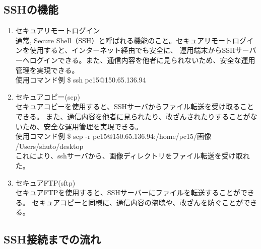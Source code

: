 \documentclass[11pt,a4j,titlepage]{jreport}
\begin{document}
\subsection{SSHの機能}



\begin{enumerate}
    \item セキュアリモートログイン\mbox{}\\通常,
    Secure Shell（SSH）と呼ばれる機能のこと。セキュアリモートログインを使用すると、インターネット経由でも安全に、
    運用端末からSSHサーバーへログインできる。また、通信内容を他者に見られないため、安全な運用管理を実現できる。
    \\使用コマンド例   \$ ssh pc15@150.65.136.94

    \item セキュアコピー(scp)\mbox{}\\セキュアコピーを使用すると、SSHサーバからファイル転送を受け取ることできる。
    また、通信内容を他者に見られたり、改ざんされたりすることがないため、安全な運用管理を実現できる。
    \\使用コマンド例   \$ scp -r pc15@150.65.136.94:/home/pc15/画像 /Users/shuto/desktop\\
    これにより、sshサーバから、画像ディレクトリをファイル転送を受け取れた。

    \item セキュアFTP(sftp)\mbox{}\\セキュアFTPを使用すると、SSHサーバーにファイルを転送することができる。
    セキュアコピーと同様に、通信内容の盗聴や、改ざんを防ぐことができる。
    
\end{enumerate}



\subsection{SSH接続までの流れ}
\end{document}
